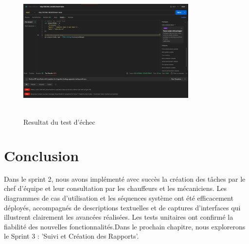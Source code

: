 \begin{figure}[h!]
  \centering
  \includegraphics[width=0.8\textwidth, height=7cm]{chap4.images/echec.png}
  \caption{ Resultat du test d'échec }

\end{figure}



\section*{Conclusion}
\bigskip
\begin{sloppypar}
  Dans le sprint 2, nous avons implémenté avec succès la création des tâches par le chef d'équipe et leur consultation par les chauffeurs et les mécaniciens. Les diagrammes de cas d'utilisation et les séquences système ont été efficacement déployés, accompagnés de descriptions textuelles et de captures d'interfaces qui illustrent clairement les avancées réalisées. Les tests unitaires ont confirmé la fiabilité des nouvelles fonctionnalités.Dans le prochain chapitre, nous explorerons le Sprint 3 : 'Suivi et Création des Rapports'.
\end{sloppypar}

